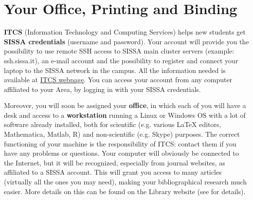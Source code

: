 \documentclass{sissavademecum}
\begin{document}
\section{Your Office, Printing and Binding}

\textbf{ITCS} (Information Technology and Computing Services) helps new students get \textbf{SISSA credentials} (username and password). Your account will provide you the possibility to use remote SSH access to SISSA main cluster servers (example: ssh.sissa.it), an e-mail account and the possibility to register and connect your laptop to the SISSA network in the campus. All the information needed is available at \href{https://www.itcs.sissa.it}{ITCS webpage}. You can access your account from any computer affiliated to your Area, by logging in with your SISSA credentials.


Moreover, you will soon be assigned your \textbf{office}, in which each of you will have a desk and access to a \textbf{workstation} running a Linux or Windows OS with a lot of software already installed, both for scientific (e.g. various LaTeX editors, Mathematica, Matlab, R) and non-scientific (e.g. Skype) purposes. The correct functioning of your machine is the responsibility of ITCS: contact them if you have any problems or questions. Your computer will obviously be connected to the Internet, but it will be recognized, especially from journal websites, as affiliated to a SISSA account. This will grant you access to many articles (virtually all the ones you may need), making your bibliographical research much easier. More details on this can be found on the Library website (see \pageref{sec:Library} for details).
\end{document}
